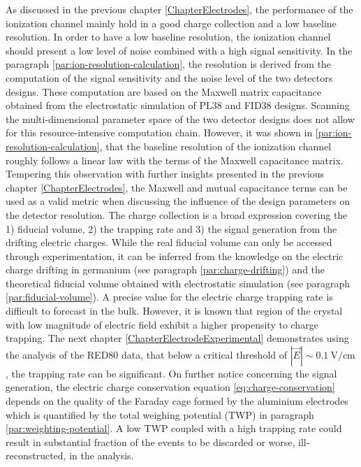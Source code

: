 As discussed in the previous chapter \ref{ChapterElectrodes}, the performance of the ionization channel mainly hold in a good charge collection and a low baseline resolution.
In order to have a low baseline resolution, the ionization channel should present a low level of noise combined with a high signal sensitivity. In the paragraph \ref{par:ion-resolution-calculation}, the resolution is derived from the computation of the signal sensitivity and the noise level of the two detectors designs. These computation are based on the Maxwell matrix capacitance obtained from the electrostatic simulation of PL38 and FID38 designs. Scanning the multi-dimensional parameter space of the two detector designs does not allow for this resource-intensive computation chain. However, it was shown in \ref{par:ion-resolution-calculation}, that the baseline resolution of the ionization channel roughly follows a linear law with the terms of the Maxwell capacitance matrix. Tempering this observation with further insights presented in the previous chapter \ref{ChapterElectrodes}, the Maxwell and mutual capacitance terms can be used as a valid metric when discussing the influence of the design parameters on the detector resolution.
The charge collection is a broad expression covering the 1) fiducial volume, 2) the trapping rate and 3) the signal generation from the drifting electric charges. While the real fiducial volume can only be accessed through experimentation, it can be inferred from the knowledge on the electric charge drifting in germanium (see paragraph \ref{par:charge-drifting}) and the theoretical fiducial volume obtained with electrostatic simulation (see paragraph \ref{par:fiducial-volume}).
A precise value for the electric charge trapping rate is difficult to forecast in the bulk. However, it is known that region of the crystal with low magnitude of electric field exhibit a higher propensity to charge trapping. The next chapter \ref{ChapterElectrodeExperimental} demonstrates using the analysis of the RED80 data, that below a critical threshold of $|\vec{E}| \sim \SI{0.1}{\volt\per\centi\meter}$, the trapping rate can be significant. %
On further notice concerning the signal generation, the electric charge conservation equation \ref{eq:charge-conservation} depends on the quality of the Faraday cage formed by the aluminium electrodes which is quantified by the total weighing potential (TWP) in paragraph \ref{par:weighting-potential}. A low TWP coupled with a high trapping rate could result in substantial fraction of the events to be discarded or worse, ill-reconstructed, in the analysis.

